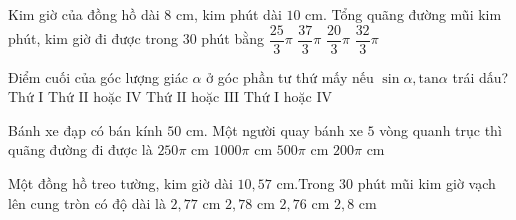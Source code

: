 \begin{ex}%
	Kim giờ của  đồng hồ dài $8$ cm, kim phút dài $10$ cm. Tổng quãng đường mũi kim phút, kim giờ đi được trong $30$ phút bằng
	\choice 
		{$\dfrac{25}{3} \pi$} 
		{$\dfrac{37}{3} \pi$} 
		{$\dfrac{20}{3}  \pi$}
		{\True  $\dfrac{32}{3} \pi$}
\end{ex}

\begin{ex}%
	 Điểm cuối của góc lượng giác $\alpha$ ở góc phần tư thứ mấy nếu $\sin \alpha,\text{tan}\alpha$ trái dấu?
	 \choice
		{Thứ $\mathrm{I} $} 
		{Thứ $\mathrm{II}$  hoặc $\mathrm{IV} $}
		{\True Thứ $\mathrm{II}$ hoặc $\mathrm{III}  $}
		{Thứ $\mathrm{I}$ hoặc  $\mathrm{IV} $}
\end{ex}

\begin{ex}%
	Bánh xe đạp có bán kính $50$ cm. Một người quay bánh xe $5$ vòng quanh trục thì  quãng đường đi được là
	\choice 
		 {$250\pi$ cm}
		{$1000\pi$  cm}
		{\True $500\pi$  cm}
		{$200\pi$  cm}
\end{ex}

\begin{ex}%
	Một đồng hồ treo tường, kim giờ dài $10{,}57$ cm.Trong $30$ phút mũi kim giờ vạch lên cung tròn có độ dài  là
	\choice 
		{\True $2{,}77$  cm}
		{$2{,}78$  cm}
		{$2{,}76$  cm}
		{$2{,}8$  cm}
\end{ex}

